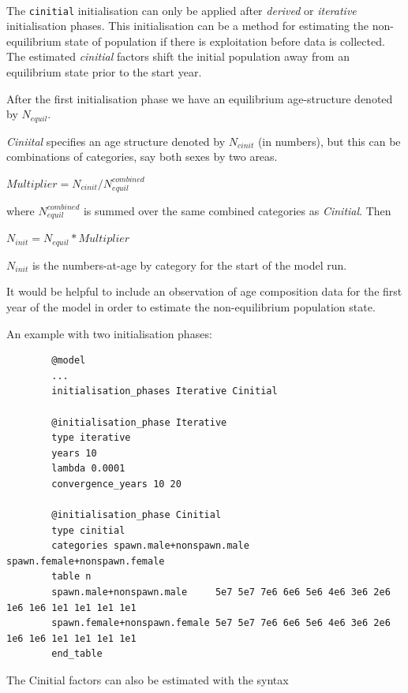 \paragraph{}\label{sec:InitialisationPhase-Cinitial} 

The \texttt{cinitial} initialisation can only be applied after \textit{derived} or \textit{iterative} initialisation phases. This initialisation can be a method for estimating the non-equilibrium state of population if there is exploitation before data is collected. The estimated \textit{cinitial} factors shift the initial population away from an equilibrium state prior to the start year.

After the first initialisation phase we have an equilibrium age-structure denoted by $N_{equil}$.

\textit{Ciniital} specifies an age structure denoted by $N_{cinit}$ (in numbers), but this can be combinations of categories, say both sexes by two areas.

$Multiplier =  N_{cinit} / N_{equil}^{combined}$

where $N_{equil}^{combined} $ is summed over the same combined categories as \textit{Cinitial}. Then

$N_{init} =  N_{equil} * Multiplier $

$N_{init}$ is the numbers-at-age by category for the start of the model run.

It would be helpful to include an observation of age composition data for the first year of the model in order to estimate the non-equilibrium population state.

An example with two initialisation phases:

{\small{\begin{verbatim}
		@model
		...
		initialisation_phases Iterative Cinitial

		@initialisation_phase Iterative
		type iterative
		years 10
		lambda 0.0001
		convergence_years 10 20

		@initialisation_phase Cinitial
		type cinitial
		categories spawn.male+nonspawn.male spawn.female+nonspawn.female
		table n
		spawn.male+nonspawn.male     5e7 5e7 7e6 6e6 5e6 4e6 3e6 2e6 1e6 1e6 1e1 1e1 1e1 1e1
		spawn.female+nonspawn.female 5e7 5e7 7e6 6e6 5e6 4e6 3e6 2e6 1e6 1e6 1e1 1e1 1e1 1e1
		end_table
		\end{verbatim}}}

The Cinitial factors can also be estimated with the syntax


